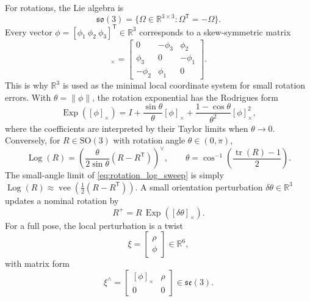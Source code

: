 \documentclass[11pt]{report}
\newcommand{\SO}{\mathrm{SO}(3)}
\newcommand{\soLie}{\mathfrak{so}(3)}
\newcommand{\seLie}{\mathfrak{se}(3)}
\newcommand{\veeop}{\operatorname{vee}}
\newcommand{\R}{\mathbb{R}}
\newcommand{\Exp}{\operatorname{Exp}}
\newcommand{\Log}{\operatorname{Log}}
\newcommand{\tr}{\operatorname{tr}}
\newcommand{\norm}[1]{\left\lVert #1 \right\rVert}
\newcommand{\tran}{^{\mathsf T}}
\begin{document}
For rotations, the Lie algebra is
\begin{equation}
\soLie=\{\Omega\in\R^{3\times3}:\Omega\tran=-\Omega\}.
\end{equation}
Every vector $\phi=[\phi_1\ \phi_2\ \phi_3]\tran\in\R^3$ corresponds to a skew-symmetric matrix
\begin{equation}
[\phi]_{\times}=\begin{bmatrix}
0 & -\phi_3 & \phi_2\\
\phi_3 & 0 & -\phi_1\\
-\phi_2 & \phi_1 & 0
\end{bmatrix}.
\label{eq:skew_definition_sweep}
\end{equation}
This is why $\R^3$ is used as the minimal local coordinate system for small rotation errors. With $\theta=\norm{\phi}$, the rotation exponential has the Rodrigues form
\begin{equation}
\Exp([\phi]_{\times})
=I+\frac{\sin\theta}{\theta}[\phi]_{\times}
 +\frac{1-\cos\theta}{\theta^2}[\phi]_{\times}^2,
\label{eq:rodrigues_exp_sweep}
\end{equation}
where the coefficients are interpreted by their Taylor limits when $\theta\to0$. Conversely, for $R\in\SO$ with rotation angle $\theta\in(0,\pi)$,
\begin{equation}
\Log(R)=\left(\frac{\theta}{2\sin\theta}(R-R\tran)\right)^\vee,
\qquad
\theta=\cos^{-1}\!\left(\frac{\tr(R)-1}{2}\right).
\label{eq:rotation_log_sweep}
\end{equation}
The small-angle limit of \eqref{eq:rotation_log_sweep} is simply $\Log(R)\approx \veeop(\tfrac12(R-R\tran))$. A small orientation perturbation $\delta\theta\in\R^3$ updates a nominal rotation by
\begin{equation}
R^+=R\,\Exp([\delta\theta]_{\times}).
\label{eq:rotation_update_sweep}
\end{equation}
For a full pose, the local perturbation is a twist
\begin{equation}
\xi=\begin{bmatrix}\rho\\ \phi\end{bmatrix}\in\R^6,
\end{equation}
with matrix form
\begin{equation}
\xi^\wedge=\begin{bmatrix}[\phi]_{\times} & \rho\\ 0 & 0\end{bmatrix}\in\seLie.
\label{eq:wedge_definition_sweep}
\end{equation}
\end{document}

